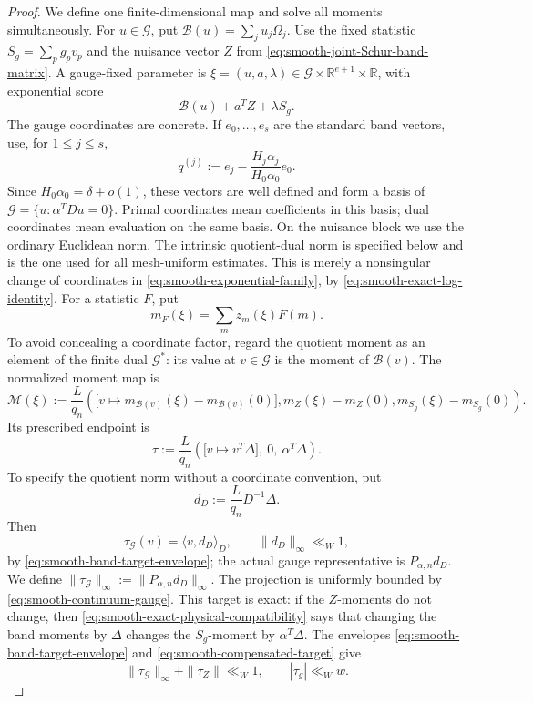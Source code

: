 \documentclass[11pt]{article}
\numberwithin{equation}{section}
\theoremstyle{definition}
\theoremstyle{remark}
\newcommand{\1}{\mathbf 1}
\begin{document}
\begin{proof}
We define one finite-dimensional map and solve all moments
simultaneously.  For \(u\in\mathcal G\), put
\(\mathscr B(u)=\sum_ju_j\Omega_j\).  Use the fixed statistic
\(S_g=\sum_pg_pv_p\) and the nuisance vector \(Z\) from
\eqref{eq:smooth-joint-Schur-band-matrix}.  A gauge-fixed parameter is
\(\xi=(u,a,\lambda)\in\mathcal G\times\mathbb R^{e+1}\times\mathbb R\),
with exponential score
\[
                         \mathscr B(u)+a^TZ+\lambda S_g.
\]
The gauge coordinates are concrete.  If \(e_0,\ldots,e_s\) are the
standard band vectors, use, for \(1\leq j\leq s\),
\begin{equation}
 q^{(j)}:=e_j-\frac{H_j\alpha_j}{H_0\alpha_0}e_0.
 \label{eq:smooth-concrete-gauge-basis}
\end{equation}
Since \(H_0\alpha_0=\delta+o(1)\), these vectors are well defined and
form a basis of \(\mathcal G=\{u:\alpha^TDu=0\}\).  Primal coordinates
mean coefficients in this basis; dual coordinates mean evaluation on
the same basis.  On the nuisance block we use the ordinary Euclidean
norm.  The intrinsic quotient-dual norm is specified below and is the
one used for all mesh-uniform estimates.
This is merely a nonsingular change of coordinates in
\eqref{eq:smooth-exponential-family}, by
\eqref{eq:smooth-exact-log-identity}.  For a statistic \(F\), put
\[
                         m_F(\xi)=\sum_m z_m(\xi)F(m).
\]
To avoid concealing a coordinate factor, regard the quotient moment as
an element of the finite dual
\(\mathcal G^*\): its value at \(v\in\mathcal G\) is the moment of
\(\mathscr B(v)\).  The normalized moment map is
\begin{equation}
 \mathcal M(\xi):=\frac L{q_n}\left(
 \big[v\mapsto m_{\mathscr B(v)}(\xi)-m_{\mathscr B(v)}(0)\big],
 m_Z(\xi)-m_Z(0),
 m_{S_g}(\xi)-m_{S_g}(0)\right).
 \label{eq:smooth-normalized-moment-map}
\end{equation}
Its prescribed endpoint is
\begin{equation}
\tau:=\frac L{q_n}\left(
 \big[v\mapsto v^T\Delta\big],\ 0,\ \alpha^T\Delta\right).
 \label{eq:smooth-normalized-moment-target}
\end{equation}
To specify the quotient norm without a coordinate convention, put
\[
 d_D:=\frac L{q_n}D^{-1}\Delta.
\]
Then
\[
 \tau_{\mathcal G}(v)=\langle v,d_D\rangle_D,\qquad
 \|d_D\|_\infty\ll_W1,
\]
by \eqref{eq:smooth-band-target-envelope}; the actual gauge
representative is \(P_{\alpha,n}d_D\).  We define
\(\|\tau_{\mathcal G}\|_\infty:=\|P_{\alpha,n}d_D\|_\infty\).
The projection is uniformly bounded by
\eqref{eq:smooth-continuum-gauge}.
This target is exact: if the \(Z\)-moments do not change, then
\eqref{eq:smooth-exact-physical-compatibility} says that changing the
band moments by \(\Delta\) changes the \(S_g\)-moment by
\(\alpha^T\Delta\).  The envelopes
\eqref{eq:smooth-band-target-envelope} and
\eqref{eq:smooth-compensated-target} give
\begin{equation}
 \|\tau_{\mathcal G}\|_\infty+\|\tau_Z\|\ll_W1,\qquad
                         |\tau_g|\ll_Ww.
 \label{eq:smooth-target-coordinate-sizes}
\end{equation}


\end{proof}
\end{document}
